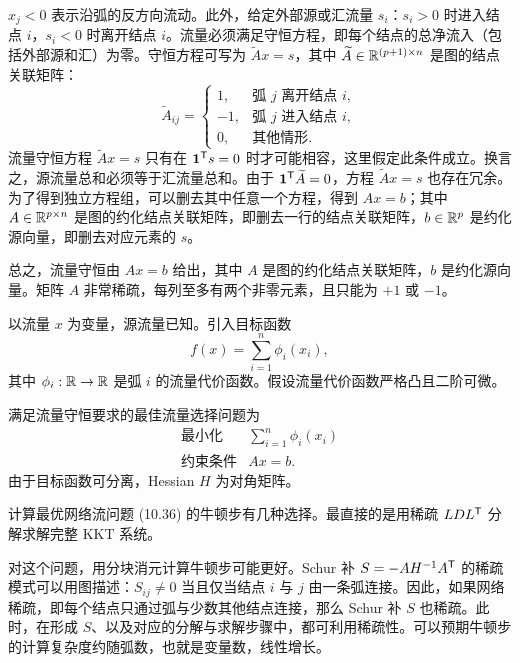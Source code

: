 $x_j<0$ 表示沿弧的反方向流动。此外，给定外部源或汇流量 $s_i$：$s_i>0$ 时进入结点 $i$，$s_i<0$ 时离开结点 $i$。流量必须满足守恒方程，即每个结点的总净流入（包括外部源和汇）为零。守恒方程可写为 $\widetilde Ax=s$，其中 $\widetilde A\in\mathbb R^{(p+1)\times n}$ 是图的结点关联矩阵：
\[\widetilde A_{ij}=\begin{cases}1,&\text{弧 }j\text{ 离开结点 }i,\\-1,&\text{弧 }j\text{ 进入结点 }i,\\0,&\text{其他情形}.\end{cases}\]
流量守恒方程 $\widetilde Ax=s$ 只有在 $\mathbf 1^\mathsf T s=0$ 时才可能相容，这里假定此条件成立。换言之，源流量总和必须等于汇流量总和。由于 $\mathbf 1^\mathsf T\widetilde A=0$，方程 $\widetilde Ax=s$ 也存在冗余。为了得到独立方程组，可以删去其中任意一个方程，得到 $Ax=b$；其中 $A\in\mathbb R^{p\times n}$ 是图的约化结点关联矩阵，即删去一行的结点关联矩阵，$b\in\mathbb R^p$ 是约化源向量，即删去对应元素的 $s$。

总之，流量守恒由 $Ax=b$ 给出，其中 $A$ 是图的约化结点关联矩阵，$b$ 是约化源向量。矩阵 $A$ 非常稀疏，每列至多有两个非零元素，且只能为 $+1$ 或 $-1$。

以流量 $x$ 为变量，源流量已知。引入目标函数
\[f(x)=\sum_{i=1}^n\phi_i(x_i),\]
其中 $\phi_i:\mathbb R\to\mathbb R$ 是弧 $i$ 的流量代价函数。假设流量代价函数严格凸且二阶可微。

满足流量守恒要求的最佳流量选择问题为
\begin{equation}\begin{array}{ll}\text{最小化}&\displaystyle\sum_{i=1}^n\phi_i(x_i)\\\text{约束条件}&Ax=b.\end{array}\tag{10.36}\end{equation}
由于目标函数可分离，Hessian $H$ 为对角矩阵。

计算最优网络流问题 (10.36) 的牛顿步有几种选择。最直接的是用稀疏 $LDL^\mathsf T$ 分解求解完整 KKT 系统。

对这个问题，用分块消元计算牛顿步可能更好。Schur 补 $S=-AH^{-1}A^\mathsf T$ 的稀疏模式可以用图描述：$S_{ij}\ne0$ 当且仅当结点 $i$ 与 $j$ 由一条弧连接。因此，如果网络稀疏，即每个结点只通过弧与少数其他结点连接，那么 Schur 补 $S$ 也稀疏。此时，在形成 $S$、以及对应的分解与求解步骤中，都可利用稀疏性。可以预期牛顿步的计算复杂度约随弧数，也就是变量数，线性增长。

